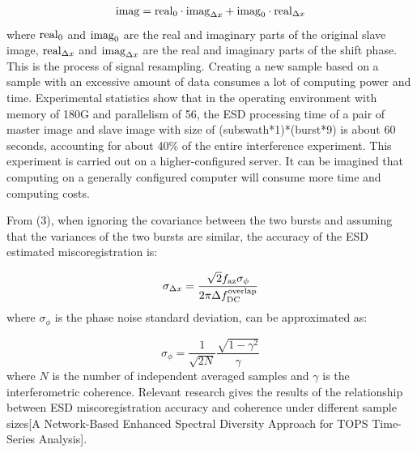 \documentclass[a4paper,fleqn]{cas-dc}
\begin{document}
\begin{equation}
    {\rm imag} = {\rm real}_0 \cdot {\rm imag}_{\Delta x} + {\rm imag}_0 \cdot {\rm real}_{\Delta x}
\end{equation}
\noindent where ${\rm real}_0$ and ${\rm imag}_0$ are the real and imaginary parts of the original slave image, ${\rm real}_{\Delta x}$ and ${\rm imag}_{\Delta x}$ are the real and imaginary parts of the shift phase. This is the process of signal resampling. Creating a new sample based on a sample with an excessive amount of data consumes a lot of computing power and time. Experimental statistics show that in the operating environment with memory of 180G and parallelism of 56, the ESD processing time of a pair of master image and slave image with size of (subswath*1)*(burst*9) is about 60 seconds, accounting for about 40\% of the entire interference experiment. This experiment is carried out on a higher-configured server. It can be imagined that computing on a generally configured computer will consume more time and computing costs. \par
From (3), when ignoring the covariance between the two bursts and assuming that the variances of the two bursts are similar, the accuracy of the ESD estimated miscoregistration is: \par
\begin{equation}
    \sigma_{\Delta x} = \frac{\sqrt{2} f_{\rm az} \sigma_\phi}{2 \pi \Delta f_{\rm DC}^{\rm overlap}}
\end{equation}
\noindent where $\sigma_\phi$ is the phase noise standard deviation, can be approximated as: \par
\begin{equation}
    \sigma_{\phi} = \frac{1}{\sqrt{2N}} \frac{\sqrt{1 - \gamma^2}}{\gamma}
\end{equation}
\noindent where $N$ is the number of independent averaged samples and $\gamma$ is the interferometric coherence. Relevant research gives the results of the relationship between ESD miscoregistration accuracy and coherence under different sample sizes[A Network-Based Enhanced Spectral Diversity Approach for TOPS Time-Series Analysis].
\end{document}
